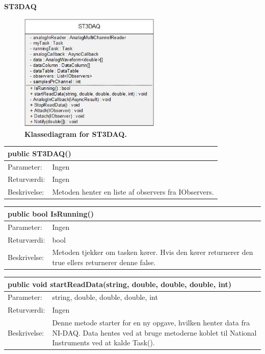 \textbf{ST3DAQ}
\begin{figure}[H]
\includegraphics[width =0.6\textwidth , center]{billeder/klassediagramdaq}
\caption{\textbf{Klassediagram for ST3DAQ.}}
\end{figure}
\begin{table}[H]
\label{tab:tabel2}
\begin{tabular}{| l | p{13cm} |}
   \hline
   \multicolumn{2}{|l|}{public ST3DAQ()} \\ \hline
   Parameter: & Ingen \\ \hline
   Returværdi: & Ingen\\ \hline
   Beskrivelse: &  Metoden henter en liste af observers fra IObservers.\\ \hline
\end{tabular}
\end{table}
\begin{table}[H]
\label{tab:tabel2}
\begin{tabular}{| l | p{13cm} |}
   \hline
   \multicolumn{2}{|l|}{public bool IsRunning()} \\ \hline
   Parameter: & Ingen \\ \hline
   Returværdi: & bool\\ \hline
   Beskrivelse: & Metoden tjekker om tasken kører. Hvis den kører returnerer den true ellers returnerer denne false. \\ \hline
\end{tabular}
\end{table}
\begin{table}[H]
\label{tab:tabel2}
\begin{tabular}{| l | p{13cm} |}
   \hline
   \multicolumn{2}{|l|}{public void startReadData(string, double, double, double, int)} \\ \hline
   Parameter: & string, double, double, double, int \\ \hline
   Returværdi: & Ingen\\ \hline
   Beskrivelse: & Denne metode starter for en ny opgave, hvilken henter data fra NI-DAQ. Data hentes ved at bruge metoderne koblet til National Instruments ved at kalde Task(). \\ \hline
\end{tabular}
\end{table}
